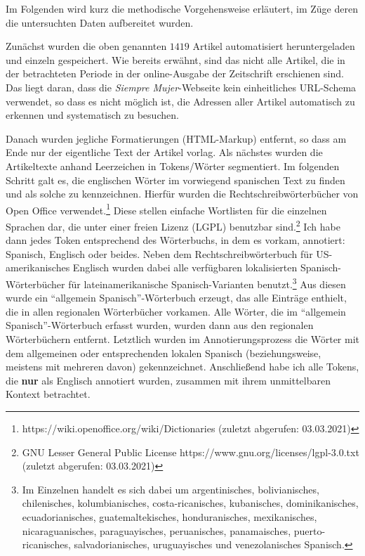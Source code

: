 Im Folgenden wird kurz die methodische Vorgehensweise erläutert, im Züge deren die untersuchten Daten aufbereitet wurden.

Zunächst wurden die oben genannten $1419$ Artikel automatisiert heruntergeladen und einzeln gespeichert.
Wie bereits erwähnt, sind das nicht alle Artikel, die in der betrachteten Periode in der online-Ausgabe der Zeitschrift erschienen sind.
Das liegt daran, dass die \textit{Siempre Mujer}-Webseite kein einheitliches URL-Schema verwendet, so dass es nicht möglich ist, die Adressen aller Artikel automatisch zu erkennen und systematisch zu besuchen.

Danach wurden jegliche Formatierungen (HTML-Markup) entfernt, so dass am Ende nur der eigentliche Text der Artikel vorlag.
Als nächstes wurden die Artikeltexte anhand Leerzeichen in Tokens/Wörter segmentiert.
Im folgenden Schritt galt es, die englischen Wörter im vorwiegend spanischen Text zu finden und als solche zu kennzeichnen.
Hierfür wurden die Rechtschreibwörterbücher von Open Office verwendet.\footnote{https://wiki.openoffice.org/wiki/Dictionaries (zuletzt abgerufen: 03.03.2021)}
Diese stellen einfache Wortlisten für die einzelnen Sprachen dar, die unter einer freien Lizenz (LGPL) benutzbar sind.\footnote{GNU Lesser General Public License https://www.gnu.org/licenses/lgpl-3.0.txt (zuletzt abgerufen: 03.03.2021)}
Ich habe dann jedes Token entsprechend des Wörterbuchs, in dem es vorkam, annotiert: Spanisch, Englisch oder beides.
Neben dem Rechtschreibwörterbuch für US-amerikanisches Englisch wurden dabei alle verfügbaren lokalisierten Spanisch-Wörterbücher für lateinamerikanische Spanisch-Varianten benutzt.\footnote{Im Einzelnen handelt es sich dabei um argentinisches, bolivianisches, chilenisches, kolumbianisches, costa-ricanisches, kubanisches, dominikanisches, ecuadorianisches, guatemaltekisches, honduranisches, mexikanisches, nicaraguanisches, paraguayisches, peruanisches, panamaisches, puerto-ricanisches, salvadorianisches, uruguayisches und venezolanisches Spanisch.}
Aus diesen wurde ein ``allgemein Spanisch''-Wörterbuch erzeugt, das alle Einträge enthielt, die in allen regionalen Wörterbücher vorkamen.
Alle Wörter, die im ``allgemein Spanisch''-Wörterbuch erfasst wurden, wurden dann aus den regionalen Wörterbüchern entfernt.
Letztlich wurden im Annotierungsprozess die Wörter mit dem allgemeinen oder entsprechenden lokalen Spanisch (beziehungsweise, meistens mit mehreren davon) gekennzeichnet.
Anschließend habe ich alle Tokens, die \textbf{nur} als Englisch annotiert wurden, zusammen mit ihrem unmittelbaren Kontext betrachtet.

